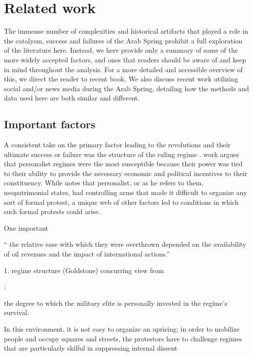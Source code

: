 \section{Related work}

The immense number of complexities and historical artifacts that played a role in the catalysm, success and failures of the Arab Spring prohibit a full exploration of the literature here.  Instead, we here provide only a summary of some of the more widely accepted factors, and ones that readers should be aware of and keep in mind throughout the analysis. For a more detailed and accessible overview of this, we direct the reader to  recent book. We also discuss recent work utilizing social and/or news media during the Arab Spring, detailing how the methods and data used here are both similar and different.  

\subsection{Important factors}
	
A consistent take on the primary factor leading to the revolutions and their ultimate success or failure was the structure of the ruling regime\cite{bellin_reconsidering_2012,comunello_will_2012,goldstone_bringing_2013} .   work argues that personalist regimes were the most susceptible because their power was tied to their ability to provide the necessary economic and political incentives to their constituency.  While \cite{comunello_will_2012} notes that personalist, or as he refers to them, neopatrimonial states, had controlling arms that made it difficult to organize any sort of formal protest, a unique web of other factors led to conditions in which such formal protests could arise.

One important 



`` the relative ease with which they were overthrown depended on the availability of oil revenues and the impact of international actions.''

	1. regime structure (Goldstone)
		concurring view from \cite{bellin_reconsidering_2012,comunello_will_2012}
		
		\cite{bellin_reconsidering_2012}:
			
			the degree to which the military elite is personally invested in the regime’s survival.
	
		\cite{comunello_will_2012}
			In this environment, it is not easy to organize an uprising; in order to mobilize people and occupy squares and streets, the protestors have to challenge regimes that are particularly skilful in suppressing internal dissent

